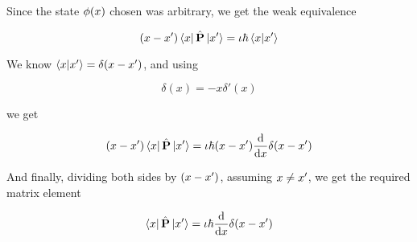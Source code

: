 Since the state $\phi(x)$ chosen was arbitrary,
we get the weak equivalence

\begin{equation}
    (x - x')\bra{x}\hat{\textbf{P}}\ket{x'} =
    \iota \hbar \braket{x}{x'}
\end{equation}

We know $\braket{x}{x'} = \delta(x - x')$, and using

\begin{equation}
    \delta(x) = -x\delta'(x)
    \nonumber
\end{equation}

we get

\begin{equation}
    (x - x')\bra{x}\hat{\textbf{P}}\ket{x'} =
    \iota \hbar (x - x') \dv{}{x}
    \delta(x - x')
\end{equation}

And finally, dividing both sides by $(x - x')$, assuming
$x \not = x'$, we get the required matrix element

\begin{equation}
    \bra{x}\hat{\textbf{P}}\ket{x'} =
    \iota \hbar \dv{}{x}\delta(x - x')
\end{equation}

\raggedleft{\qedsymbol}

